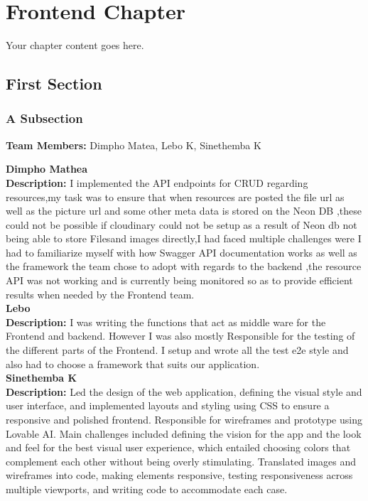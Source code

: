 \chapter{Frontend Chapter}

Your chapter content goes here. 

\section{First Section}

\subsection{A Subsection}


\textbf{Team Members:} Dimpho Matea, Lebo K, Sinethemba K

\textbf{Dimpho Mathea} \\
\textbf{Description:} I implemented the API endpoints for CRUD regarding resources,my task was to ensure that when resources are posted the file url as well as the picture url and some other meta data is stored on the Neon DB ,these could not be possible if cloudinary could not be setup as a result of Neon db not being able to store Filesand images directly,I had faced multiple challenges were I had to familiarize myself with how Swagger API documentation works as well as the framework the team chose to adopt with regards to the backend ,the resource API was not working and is currently being monitored so as to provide efficient results when needed by the Frontend team. \\[2mm]

\textbf{Lebo} \\
\textbf{Description:} I was writing the functions that act as middle ware for the Frontend and backend. However I was also mostly Responsible for the testing of the different parts of the Frontend. I setup and wrote all the test e2e style and also had to choose a framework that suits our application. \\[2mm]

\textbf{Sinethemba K} \\
\textbf{Description:} Led the design of the web application, defining the visual style and user interface, and implemented layouts and styling using CSS to ensure a responsive and polished frontend. Responsible for wireframes and prototype using Lovable AI. Main challenges included defining the vision for the app and the look and feel for the best visual user experience, which entailed choosing colors that complement each other without being overly stimulating. Translated images and wireframes into code, making elements responsive, testing responsiveness across multiple viewports, and writing code to accommodate each case. \\[2mm]
